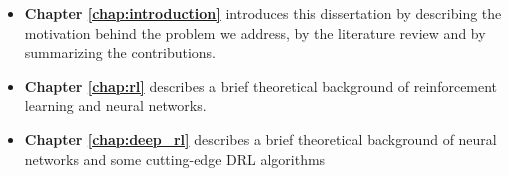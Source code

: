\begin{itemize}
    \item \textbf{Chapter \ref{chap:introduction}} introduces this dissertation by describing the motivation 
    behind the problem we address, by the literature review and by summarizing the contributions.

    \item \textbf{Chapter \ref{chap:rl}} describes a brief theoretical background of reinforcement learning and neural networks.
    
    \item \textbf{Chapter \ref{chap:deep_rl}} describes a brief theoretical background of neural networks and some cutting-edge DRL algorithms






\end{itemize}
